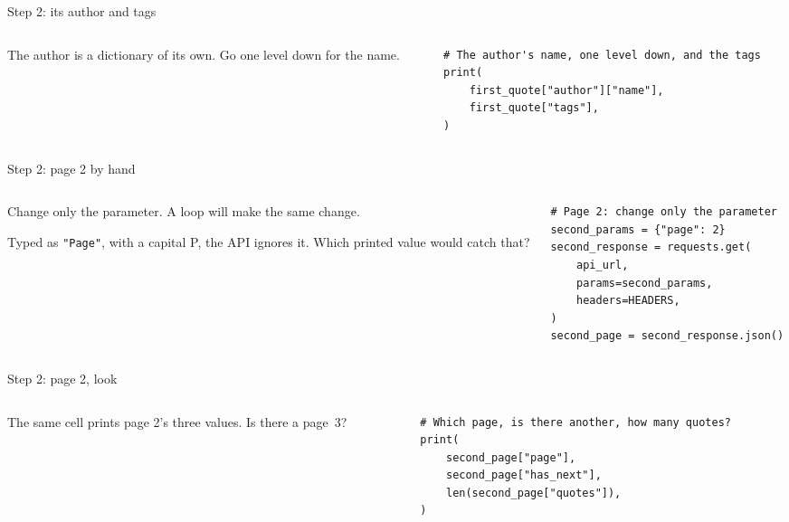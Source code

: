 \documentclass[9pt,aspectratio=169]{beamer}
\begin{document}
\begin{frame}[fragile]{Step 2: its author and tags}
    \begin{columns}[T]
        \begin{column}{0.37\textwidth}
            The author is a dictionary of its own. Go one level down for the name.
        \end{column}
        \begin{column}{0.6\textwidth}
\begin{lstlisting}[style=lab]
# The author's name, one level down, and the tags
print(
    first_quote["author"]["name"],
    first_quote["tags"],
)
\end{lstlisting}
        \end{column}
    \end{columns}
\end{frame}

\begin{frame}[fragile]{Step 2: page 2 by hand}
    \begin{columns}[T]
        \begin{column}{0.37\textwidth}
            Change only the parameter. A loop will make the same change.

            \medskip
            Typed as \texttt{"Page"}, with a capital P, the API ignores it. Which printed value would catch that?
        \end{column}
        \begin{column}{0.6\textwidth}
\begin{lstlisting}[style=lab]
# Page 2: change only the parameter
second_params = {"page": 2}
second_response = requests.get(
    api_url,
    params=second_params,
    headers=HEADERS,
)
second_page = second_response.json()
\end{lstlisting}
        \end{column}
    \end{columns}
\end{frame}

\begin{frame}[fragile]{Step 2: page 2, look}
    \begin{columns}[T]
        \begin{column}{0.37\textwidth}
            The same cell prints page 2's three values. Is there a page~3?
        \end{column}
        \begin{column}{0.6\textwidth}
\begin{lstlisting}[style=lab]
# Which page, is there another, how many quotes?
print(
    second_page["page"],
    second_page["has_next"],
    len(second_page["quotes"]),
)
\end{lstlisting}
        \end{column}
    \end{columns}
\end{frame}
\end{document}
